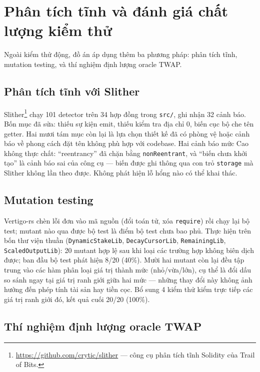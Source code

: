 \documentclass[../DoAn.tex]{subfiles}
\begin{document}
\section{Phân tích tĩnh và đánh giá chất lượng kiểm thử}
\label{sec:static-mutation}

Ngoài kiểm thử động, đồ án áp dụng thêm ba phương pháp: phân tích tĩnh, mutation testing, và thí nghiệm định lượng oracle TWAP.

\subsection{Phân tích tĩnh với Slither}

Slither\footnote{\url{https://github.com/crytic/slither} --- công cụ phân tích tĩnh Solidity của Trail of Bits.} chạy 101 detector trên 34 hợp đồng trong \texttt{src/}, ghi nhận 32 cảnh báo. Bốn mục đã sửa: thiếu sự kiện emit, thiếu kiểm tra địa chỉ 0, biến cục bộ che tên getter. Hai mươi tám mục còn lại là lựa chọn thiết kế đã có phòng vệ hoặc cảnh báo về phong cách đặt tên không phù hợp với codebase. Hai cảnh báo mức Cao không thực chất: ``reentrancy'' đã chặn bằng \texttt{nonReentrant}, và ``biến chưa khởi tạo'' là cảnh báo sai của công cụ --- biến được ghi thông qua con trỏ \texttt{storage} mà Slither không lần theo được. Không phát hiện lỗ hổng nào có thể khai thác.

\subsection{Mutation testing}

Vertigo-rs chèn lỗi đơn vào mã nguồn (đổi toán tử, xóa \texttt{require}) rồi chạy lại bộ test; mutant nào qua được bộ test là điểm bộ test chưa bao phủ. Thực hiện trên bốn thư viện thuần (\texttt{DynamicStakeLib}, \texttt{DecayCursorLib}, \texttt{RemainingLib}, \texttt{ScaledOutputLib}): 20 mutant hợp lệ sau khi loại các trường hợp không biên dịch được; ban đầu bộ test phát hiện 8/20 (40\%). Mười hai mutant còn lại đều tập trung vào các hàm phân loại giá trị thành mức (nhỏ/vừa/lớn), cụ thể là đổi dấu so sánh ngay tại giá trị ranh giới giữa hai mức --- những thay đổi này không ảnh hưởng đến phép tính tài sản hay tiền cọc. Bổ sung 4 kiểm thử kiểm trực tiếp các giá trị ranh giới đó, kết quả cuối 20/20 (100\%).

\subsection{Thí nghiệm định lượng oracle TWAP}
\end{document}
